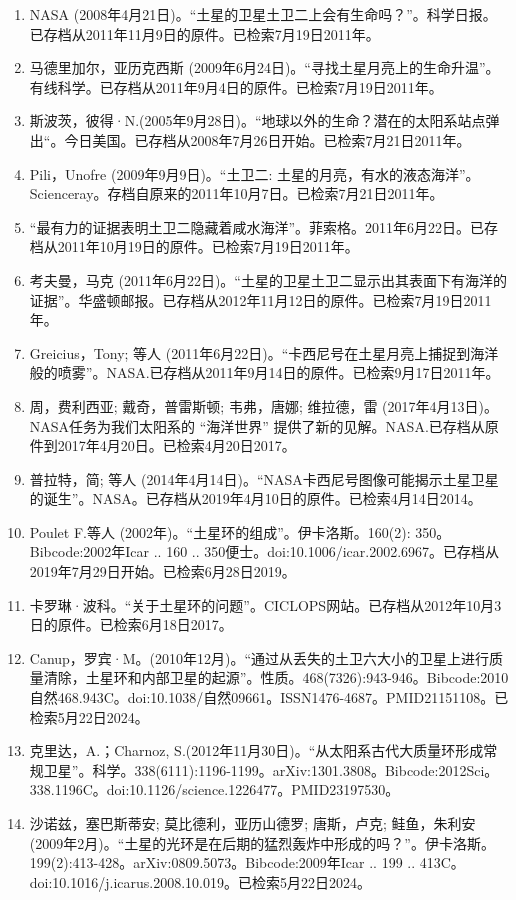 \begin{enumerate}
\item NASA (2008年4月21日)。“土星的卫星土卫二上会有生命吗？”。科学日报。已存档从2011年11月9日的原件。已检索7月19日2011年。
\item 马德里加尔，亚历克西斯 (2009年6月24日)。“寻找土星月亮上的生命升温”。有线科学。已存档从2011年9月4日的原件。已检索7月19日2011年。
\item 斯波茨，彼得·N.(2005年9月28日)。“地球以外的生命？潜在的太阳系站点弹出“。今日美国。已存档从2008年7月26日开始。已检索7月21日2011年。
\item Pili，Unofre (2009年9月9日)。“土卫二: 土星的月亮，有水的液态海洋”。Scienceray。存档自原来的2011年10月7日。已检索7月21日2011年。
\item “最有力的证据表明土卫二隐藏着咸水海洋”。菲索格。2011年6月22日。已存档从2011年10月19日的原件。已检索7月19日2011年。
\item 考夫曼，马克 (2011年6月22日)。“土星的卫星土卫二显示出其表面下有海洋的证据”。华盛顿邮报。已存档从2012年11月12日的原件。已检索7月19日2011年。
\item Greicius，Tony; 等人 (2011年6月22日)。“卡西尼号在土星月亮上捕捉到海洋般的喷雾”。NASA.已存档从2011年9月14日的原件。已检索9月17日2011年。
\item 周，费利西亚; 戴奇，普雷斯顿; 韦弗，唐娜; 维拉德，雷 (2017年4月13日)。NASA任务为我们太阳系的 “海洋世界” 提供了新的见解。NASA.已存档从原件到2017年4月20日。已检索4月20日2017。
\item 普拉特，简; 等人 (2014年4月14日)。“NASA卡西尼号图像可能揭示土星卫星的诞生”。NASA。已存档从2019年4月10日的原件。已检索4月14日2014。
\item Poulet F.等人 (2002年)。“土星环的组成”。伊卡洛斯。160(2): 350。Bibcode:2002年Icar .. 160 .. 350便士。doi:10.1006/icar.2002.6967。已存档从2019年7月29日开始。已检索6月28日2019。
\item 卡罗琳·波科。“关于土星环的问题”。CICLOPS网站。已存档从2012年10月3日的原件。已检索6月18日2017。
\item Canup，罗宾·M。(2010年12月)。“通过从丢失的土卫六大小的卫星上进行质量清除，土星环和内部卫星的起源”。性质。468(7326):943-946。Bibcode:2010自然468.943C。doi:10.1038/自然09661。ISSN1476-4687。PMID21151108。已检索5月22日2024。  
\item 克里达，A.；Charnoz, S.(2012年11月30日)。“从太阳系古代大质量环形成常规卫星”。科学。338(6111):1196-1199。arXiv:1301.3808。Bibcode:2012Sci。338.1196C。doi:10.1126/science.1226477。PMID23197530。 
\item 沙诺兹，塞巴斯蒂安; 莫比德利，亚历山德罗; 唐斯，卢克; 鲑鱼，朱利安 (2009年2月)。“土星的光环是在后期的猛烈轰炸中形成的吗？”。伊卡洛斯。199(2):413-428。arXiv:0809.5073。Bibcode:2009年Icar .. 199 .. 413C。doi:10.1016/j.icarus.2008.10.019。已检索5月22日2024。

\end{enumerate}
